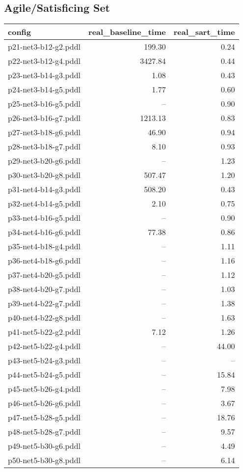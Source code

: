 \documentclass{article}
\begin{document}
                    \subsection*{Agile/Satisficing Set}
                    
                            \begin{center}
                            \scriptsize
                            \begin{tabular}{@{}l|r|r@{}}
                            config & real\_baseline\_time & real\_sart\_time\\\midrule
                             p21-net3-b12-g2.pddl&199.30&0.24\\
 p22-net3-b12-g4.pddl&3427.84&0.44\\
 p23-net3-b14-g3.pddl&1.08&0.43\\
 p24-net3-b14-g5.pddl&1.77&0.60\\
 p25-net3-b16-g5.pddl&--&0.90\\
 p26-net3-b16-g7.pddl&1213.13&0.83\\
 p27-net3-b18-g6.pddl&46.90&0.94\\
 p28-net3-b18-g7.pddl&8.10&0.93\\
 p29-net3-b20-g6.pddl&--&1.23\\
 p30-net3-b20-g8.pddl&507.47&1.20\\
 p31-net4-b14-g3.pddl&508.20&0.43\\
 p32-net4-b14-g5.pddl&2.10&0.75\\
 p33-net4-b16-g5.pddl&--&0.90\\
 p34-net4-b16-g6.pddl&77.38&0.86\\
 p35-net4-b18-g4.pddl&--&1.11\\
 p36-net4-b18-g6.pddl&--&1.16\\
 p37-net4-b20-g5.pddl&--&1.12\\
 p38-net4-b20-g7.pddl&--&1.03\\
 p39-net4-b22-g7.pddl&--&1.38\\
 p40-net4-b22-g8.pddl&--&1.63\\
 p41-net5-b22-g2.pddl&7.12&1.26\\
 p42-net5-b22-g4.pddl&--&44.00\\
 p43-net5-b24-g3.pddl&--&--\\
 p44-net5-b24-g5.pddl&--&15.84\\
 p45-net5-b26-g4.pddl&--&7.98\\
 p46-net5-b26-g6.pddl&--&3.67\\
 p47-net5-b28-g5.pddl&--&18.76\\
 p48-net5-b28-g7.pddl&--&9.57\\
 p49-net5-b30-g6.pddl&--&4.49\\
 p50-net5-b30-g8.pddl&--&6.14
                            \end{tabular}
                            \end{center}
                    
\end{document}
